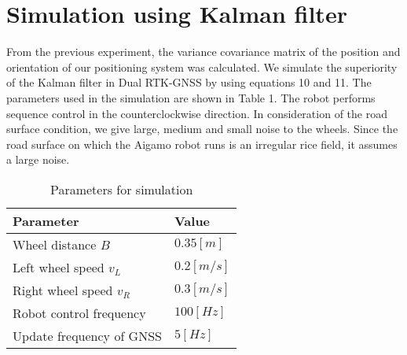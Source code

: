 \documentclass[a4paper]{article}
\begin{document}
\section{Simulation using Kalman filter}

From the previous experiment, the variance covariance matrix of the position and orientation 
of our positioning system was calculated. We simulate the superiority of the Kalman filter 
in Dual RTK-GNSS by using equations 10 and 11. The parameters used in the simulation 
are shown in Table 1. The robot performs sequence control in the counterclockwise 
direction. In consideration of the road surface condition, we give large, medium and small noise 
to the wheels. Since the road surface on which the Aigamo robot runs is an irregular 
rice field, it assumes a large noise.


\begin{table}[H]
    \caption{Parameters for simulation}
    \label{table:table1}
    \centering
    \begin{tabular}{|l|l|}
        \hline
        Parameter & Value \\
        \hline \hline
        Wheel distance \(B\) & \(0.35[m]\) \\
        Left wheel speed \(v_L\) & \(0.2 [m/s]\) \\
        Right wheel speed \(v_R\) & \(0.3 [m/s]\) \\
        Robot control frequency & \(100 [Hz]\) \\
        Update frequency of GNSS & \(5 [Hz]\) \\
       \hline
    \end{tabular}
\end{table}

\newlength{\myheight}
\setlength{\myheight}{1.2cm}
\end{document}
